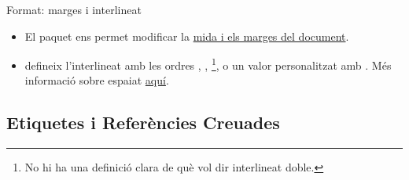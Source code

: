 \begin{frame}[fragile]{Format: marges i interlineat}
\begin{itemize}
\item El paquet  ens permet modificar la \href{https://www.overleaf.com/learn/latex/Page_size_and_margins}{mida i els marges del document}.
\item {} defineix l'interlineat amb les ordres , , \footnote{No hi ha una definició clara de què vol dir interlineat doble.}, o un valor personalitzat amb . Més informació sobre espaiat \href{https://www.overleaf.com/learn/latex/Articles/How_to_change_paragraph_spacing_in_LaTeX#The_setspace_package}{aquí}.
\end{itemize}

\begin{exampletiny}
\usepackage{geometry}
\geometry{
a4paper,
left=30mm,
right=30mm,
top=25mm,
bottom=25mm,
}

\usepackage{setspace}
\end{exampletiny}

\end{frame}

\subsection{Etiquetes i Referències Creuades}

